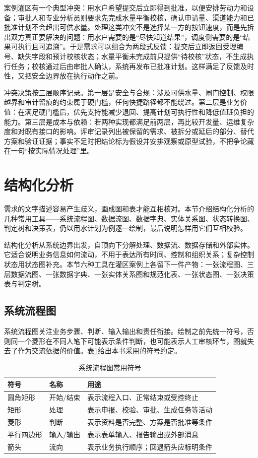 案例灌区有一个典型冲突：用水户希望提交后立即得到批准，以便安排劳动力和设备；审批人和专业分析员则要求先完成水量平衡校核，确认申请量、渠道能力和已批准计划不会超出可供水量。处理这类冲突不是选择某一方的按钮速度，而是先拆出双方真正要解决的问题：用水户需要的是“尽快知道结果”，调度侧需要的是“结果可执行且可追溯”。于是需求可以组合为两段式反馈：提交后立即返回受理编号、缺失字段和预计校核状态；水量平衡未完成前只提供“待校核”状态，不生成执行任务；校核通过后由审批人确认，系统再发布已批准计划。这样满足了反馈及时性，又把安全边界放在执行动作之前。

冲突决策按三层顺序记录。第一层是安全与合规：涉及可供水量、闸门控制、权限越界和审计留痕的约束属于硬门槛，任何快捷路径都不能绕过。第二层是业务价值：在满足硬门槛后，优先支持能减少退回、提高计划可执行性和降低值班负担的能力。第三层是成本与依赖：若两种实现都满足前两层，再比较开发量、运维复杂度和对既有接口的影响。评审记录列出被保留的需求、被拆分或延后的部分、替代方案和验证证据；事实不足时把结论标为假设并安排观察或原型试验，不把争论藏在一句“按实际情况处理”里。

\section{结构化分析}

需求的文字描述容易产生歧义，画成图和表才能互相核对。本节介绍结构化分析的几种常用工具——系统流程图、数据流图、数据字典、实体关系图、状态转换图、判定树和决策表，仍以用水计划为例逐一绘制，最后说明怎样用它们互相校验。

结构化分析从系统边界出发，自顶向下分解处理、数据流、数据存储和外部实体。它适合说明业务信息如何流动，不用于表达所有时间、控制和组织关系；复杂控制状态用状态图补充。本节六种工具在灌区案例上各留下一件产物：一张流程图、三层数据流图、一张数据字典、一张实体关系图和规范化表、一张状态图、一张决策表与判定树。

\subsection{系统流程图}

系统流程图关注业务步骤、判断、输入输出和责任衔接。绘制之前先统一符号，否则同一个菱形在不同人笔下可能表示条件判断，也可能表示人工审核环节，图就失去了作为交流依据的价值。表\ref{tab:system-flow-symbols}给出本书采用的符号约定。

\begin{table}[htbp]
\centering
\caption{系统流程图常用符号}\label{tab:system-flow-symbols}
\begin{tabular}{p{2.5cm}p{3.2cm}p{6.6cm}}
\toprule
符号 & 名称 & 用途 \\
\midrule
圆角矩形 & 开始/结束 & 表示流程入口、正常结束或受控终止 \\
矩形 & 处理 & 表示申报、校验、审批、生成任务等活动 \\
菱形 & 判断 & 表示资料是否完整、方案是否批准等条件 \\
平行四边形 & 输入/输出 & 表示表单输入、报告输出或外部消息 \\
箭头 & 流向 & 表示业务执行顺序；回退箭头应标明条件 \\
\bottomrule
\end{tabular}
\end{table}

